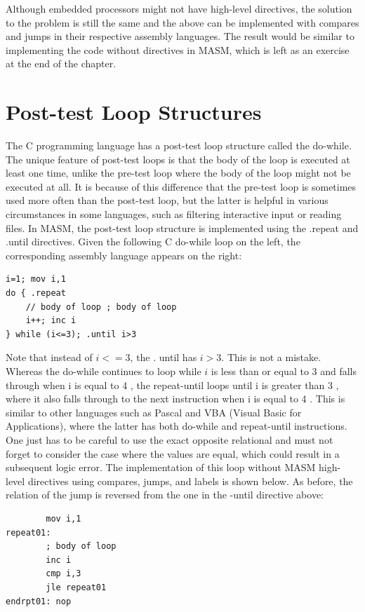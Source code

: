 \documentclass[10pt]{book}
\begin{document}
Although embedded processors might not have high-level directives, the solution to the problem is still the same and the above can be implemented with compares and jumps in their respective assembly languages. The result would be similar to implementing the code without directives in MASM, which is left as an exercise at the end of the chapter.

\section{Post-test Loop Structures}
The C programming language has a post-test loop structure called the do-while. The unique feature of post-test loops is that the body of the loop is executed at least one time, unlike the pre-test loop where the body of the loop might not be executed at all. It is because of this difference that the pre-test loop is sometimes used more often than the post-test loop, but the latter is helpful in various circumstances in some languages, such as filtering interactive input or reading files. In MASM, the post-test loop structure is implemented using the .repeat and .until directives. Given the following C do-while loop on the left, the corresponding assembly language appears on the right:

\begin{verbatim}
i=1; mov i,1
do { .repeat
    // body of loop ; body of loop
    i++; inc i
} while (i<=3); .until i>3
\end{verbatim}

Note that instead of $i<=3$, the . until has $i>3$. This is not a mistake. Whereas the do-while continues to loop while $i$ is less than or equal to 3 and falls through when i is equal to 4 , the repeat-until loops until i is greater than 3 , where it also falls through to the next instruction when i is equal to 4 . This is similar to other languages such as Pascal and VBA (Visual Basic for Applications), where the latter has both do-while and repeat-until instructions. One just has to be careful to use the exact opposite relational and must not forget to consider the case where the values are equal, which could result in a subsequent logic error. The implementation of this loop without MASM high-level directives using compares, jumps, and labels is shown below. As before, the relation of the jump is reversed from the one in the -until directive above:


\begin{verbatim}
        mov i,1
repeat01:
        ; body of loop
        inc i
        cmp i,3
        jle repeat01
endrpt01: nop
\end{verbatim}
\end{document}
